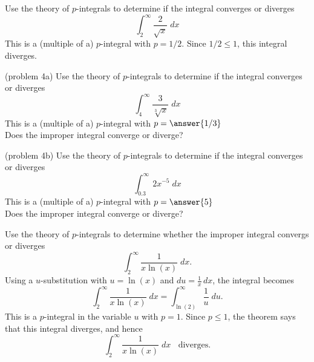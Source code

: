 \documentclass[handout]{ximera}
\begin{document}
\begin{example}[example 4]
Use the theory of $p$-integrals to determine if the integral converges or diverges
\[
\int_2^\infty \frac{2}{\sqrt x} \; dx
\]
This is a (multiple of a) $p$-integral with $p = 1/2$. Since $1/2 \leq 1$, this integral diverges.
\end{example}




\begin{problem}(problem 4a)
Use the theory of $p$-integrals to determine if the integral converges or diverges
\[
\int_4^\infty \frac{3}{\sqrt[3] x} \; dx
\]
This is a (multiple of a) $p$-integral with $p = \answer{1/3}$\\
Does the improper integral converge or diverge?
\begin{multipleChoice}
\end{multipleChoice}
\end{problem}





\begin{problem}(problem 4b)
Use the theory of $p$-integrals to determine if the integral converges or diverges
\[
\int_{0.3}^\infty 2x^{-5} \; dx
\]
This is a (multiple of a) $p$-integral with $p = \answer{5}$\\
Does the improper integral converge or diverge?
\begin{multipleChoice}
\end{multipleChoice}
\end{problem}



\begin{example}[example 5]
Use the theory of $p$-integrals to determine whether the improper integral convergs or diverges
\[
\int_2^\infty \frac{1}{x\ln(x)} \; dx.
\]
Using a $u$-substitution with $u = \ln(x)$ and $du = \frac{1}{x} \, dx$, the integral becomes
\[
\int_2^\infty \frac{1}{x\ln(x)} \; dx = \int_{\ln(2)}^\infty \frac{1}{u} \; du.
\]
This is a $p$-integral in the variable $u$ with $p=1$. Since $p \leq 1$, the theorem says that this integral diverges, and hence
\[
\int_2^\infty \frac{1}{x\ln(x)} \; dx \;\; \text{ diverges}.
\]
\end{example}
\end{document}

